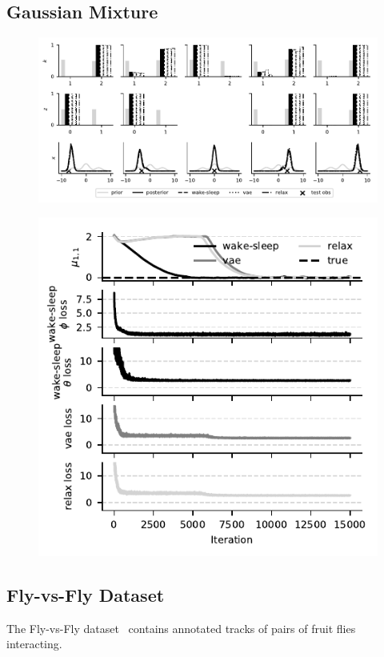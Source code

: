 \documentclass{article}
\begin{document}
\subsection{Gaussian Mixture}
\begin{figure}[!htb]
    \includegraphics{figures/gmm-open-universe/gmm_open_universe_inference.pdf}
\end{figure}

\begin{figure}[!htb]
    \includegraphics{figures/gmm-open-universe/gmm_open_universe_model_param_and_loss.pdf}
\end{figure}

\subsection{Fly-vs-Fly Dataset}
The Fly-vs-Fly dataset~\citep{eyjolfsdottir2014detecting} contains annotated tracks of pairs of fruit flies interacting.
\end{document}
